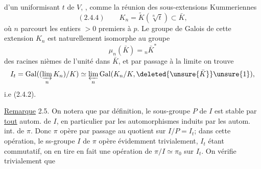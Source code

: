 
d'un uniformisant \deleted{$\unsure{\varpi}$} $t$ de $V$, , comme la réunion des sous-extensions  Kummeriennes
\[
(2.4.4)\qquad K_n=\widetilde K(\sqrt[n]{t})\subset\bar K,
\]
où $n$ parcourt les entiers $>0$ premiers à $p$.
Le groupe de Galois de cette extension $K_n$ est naturellement isomorphe au groupe
\[
\mu_n(\bar K)={}_n\bar K^*
\]
des racines nièmes de l'unité dans $\bar K$, et par passage à la limite on trouve
\[
 I_t=\operatorname{Gal}((\varinjlim_n K_n)/K)\simeq\varprojlim_n\operatorname{Gal}(K_n/K,\deleted{\unsure{\bar K}}\unsure{1}),
\]
i.e (2.4.2).

\uline{Remarque} 2.5. On notera que par définition, le sous-groupe $P$ de $I$ est stable par \uline{tout} autom. de $I$, en particulier par les automorphismes induits par les autom. int. de $\pi$. Donc $\pi$ opère par passage au quotient sur $I/P=I_t$;  dans cette opération, le  ss-groupe $I$ de $\pi$ opère évidemment trivialement, $I_t$ étant commutatif, on en tire en fait une opération de $\pi/I\simeq\pi_0$ sur $I_t$.  On vérifie trivialement que
